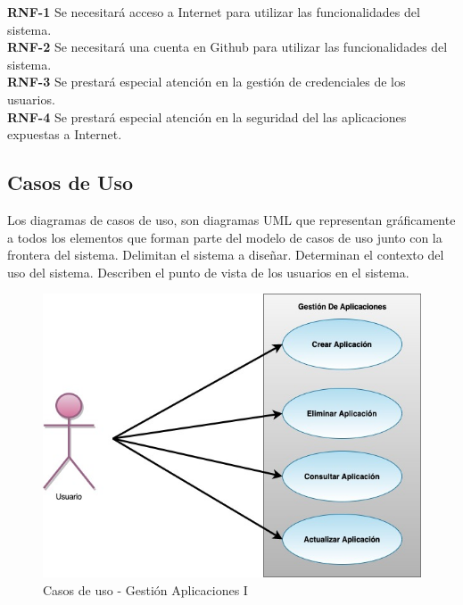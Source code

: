 \documentclass[a4paper,11pt]{book}
\begin{document}
\textbf{RNF-1} Se necesitará acceso a Internet para utilizar las funcionalidades del sistema.\\

\textbf{RNF-2} Se necesitará una cuenta en Github para utilizar las funcionalidades del sistema.\\

\textbf{RNF-3} Se prestará especial atención en la gestión de credenciales de los usuarios.\\

\textbf{RNF-4} Se prestará especial atención en la seguridad del  las aplicaciones expuestas a Internet.
\subsection{Casos de Uso}
Los diagramas de casos de uso, son diagramas UML que representan gráficamente a todos los elementos que forman parte del modelo de casos de uso junto con la frontera del sistema. Delimitan el sistema a diseñar. Determinan el contexto del uso del sistema. Describen el punto de vista de los usuarios  en el sistema.


\begin{figure}[H]
\centering
\includegraphics[scale=0.50]{imagenes/casosUso1.jpg}
\caption{ Casos de uso - Gestión Aplicaciones I~\cite{diagrama}  }
\end{figure}
\end{document}
